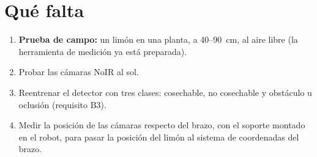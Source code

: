 \documentclass[11pt,a4paper]{article}
\begin{document}
\section{Qué falta}
\begin{enumerate}
  \item \textbf{Prueba de campo:} un limón en una planta, a 40--90~cm, al aire libre (la herramienta de medición ya
        está preparada).
  \item Probar las cámaras NoIR al sol.
  \item Reentrenar el detector con tres clases: cosechable, no cosechable y obstáculo u oclusión (requisito B3).
  \item Medir la posición de las cámaras respecto del brazo, con el soporte montado en el robot, para pasar la
        posición del limón al sistema de coordenadas del brazo.
\end{enumerate}
\end{document}
